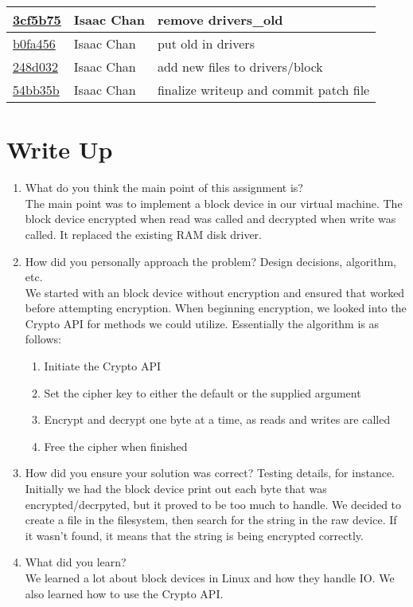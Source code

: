 \documentclass[letterpaper,10pt,draftclsnofoot,onecolumn,titlepage]{IEEEtran}
\begin{document}
\begin{tabular}{p{2cm} p{2cm} p{10cm}}
\href{https://github.com/courtbonn/CS-444/commit/3cf5b75bee244d1f3d04d7c9e3a9957195effefc}{3cf5b75} & Isaac Chan & remove drivers\_old\\\hline
\href{https://github.com/courtbonn/CS-444/commit/b0fa4564d7ce8b52afb8add362da61b71f51f05a}{b0fa456} & Isaac Chan & put old in drivers\\\hline
\href{https://github.com/courtbonn/CS-444/commit/248d032686fa61e84b5ee23e3f8d55c3667afae3}{248d032} & Isaac Chan & add new files to drivers/block\\\hline
\href{https://github.com/courtbonn/CS-444/commit/54bb35bb04a328701dc796a01ff7acc500de1888}{54bb35b} & Isaac Chan & finalize writeup and commit patch file\\\hline\end{tabular}

\section{Write Up}
\begin{enumerate}
                \item What do you think the main point of this assignment is? \\
The main point was to implement a block device in our virtual machine. The block device encrypted when read was called and decrypted when write was called. It replaced the existing RAM disk driver.
                \item How did you personally approach the problem? Design decisions, algorithm, etc. \\
We started with an block device without encryption and ensured that worked before attempting encryption. When beginning encryption, we looked into the Crypto API for methods we could utilize. Essentially the algorithm is as follows:
\begin{enumerate}
   \item Initiate the Crypto API
   \item Set the cipher key to either the default or the supplied argument
   \item Encrypt and decrypt one byte at a time, as reads and writes are called
   \item Free the cipher when finished
\end{enumerate}

                \item How did you ensure your solution was correct? Testing details, for instance. \\
Initially we had the block device print out each byte that was encrypted/decrpyted, but it proved to be too much to handle. We decided to create a file in the filesystem, then search for the string in the raw device. If it wasn't found, it means that the string is being encrypted correctly.
                \item What did you learn? \\
We learned a lot about block devices in Linux and how they handle IO. We also learned how to use the Crypto API.
\end{enumerate}
\end{document}
